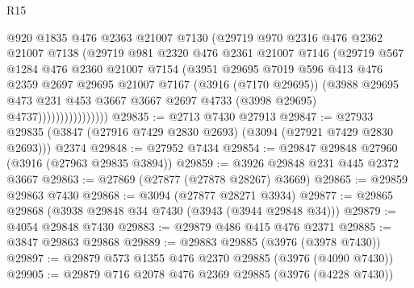 \begin{lexlean}{R15}
\begin{coremodule}
                          @920
                          @1835
                          @476
                          @2363
                          @21007
                          @7130
                          (@29719
                            @970
                            @2316
                            @476
                            @2362
                            @21007
                            @7138
                            (@29719
                              @981
                              @2320
                              @476
                              @2361
                              @21007
                              @7146
                              (@29719
                                @567
                                @1284
                                @476
                                @2360
                                @21007
                                @7154
                                (@3951
                                  @29695
                                  @7019
                                  @596
                                  @413
                                  @476
                                  @2359
                                  @2697
                                  @29695
                                  @21007
                                  @7167
                                  (@3916 (@7170 @29695))
                                  (@3988
                                    @29695
                                    @473
                                    @231
                                    @453
                                    @3667
                                    @3667
                                    @2697
                                    @4733
                                    (@3998 @29695)
                                    @4737))))))))))))))))
@29835 := @2713 @7430 @27913
@29847 := @27933 @29835 (@3847 (@27916 @7429 @2830 @2693) (@3094 (@27921 @7429 @2830 @2693))) @2374
@29848 := @27952 @7434
@29854 := @29847 @29848 @27960 (@3916 (@27963 @29835 @3894))
@29859 := @3926 @29848 @231 @445 @2372 @3667
@29863 := @27869 (@27877 (@27878 @28267) @3669)
@29865 := @29859 @29863 @7430
@29868 := @3094 (@27877 @28271 @3934)
@29877 := @29865 @29868 (@3938 @29848 @34 @7430 (@3943 (@3944 @29848 @34)))
@29879 := @4054 @29848 @7430
@29883 := @29879 @486 @415 @476 @2371
@29885 := @3847 @29863 @29868
@29889 := @29883 @29885 (@3976 (@3978 @7430))
@29897 := @29879 @573 @1355 @476 @2370 @29885 (@3976 (@4090 @7430))
@29905 := @29879 @716 @2078 @476 @2369 @29885 (@3976 (@4228 @7430))

\end{coremodule}
\end{lexlean}
